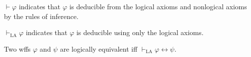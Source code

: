 $\vdash \varphi$ indicates that $\varphi$ is deducible from the logical axioms and nonlogical axioms by the rules of inference.

$\vdash_{\text{LA}} \varphi$ indicates that $\varphi$ is deducible using only the logical axioms.

Two wffs $\varphi$ and $\psi$ are logically equivalent iff $\vdash_{\text{LA}} \varphi \leftrightarrow \psi$.
